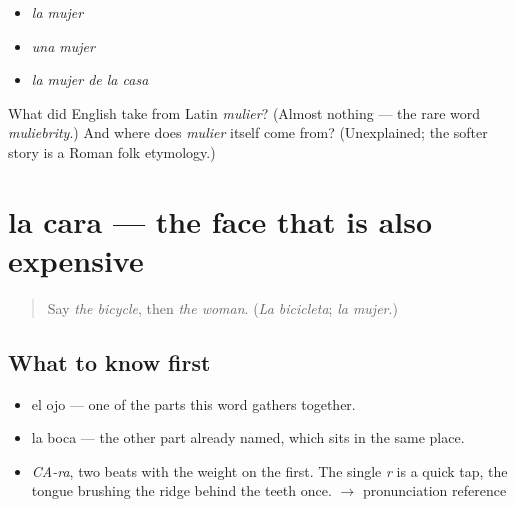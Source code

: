 \begin{itemize}
\raggedright
  \item \emph{la mujer}
  \item \emph{una mujer}
  \item \emph{la mujer de la casa}
\end{itemize}

\begin{tcolorbox}[breakable,colback=teal!4,colframe=teal!35!black,title={Before you move on}]
What did English take from Latin \emph{mulier}? (Almost nothing — the rare word \emph{muliebrity}.) And where does \emph{mulier} itself come from? (Unexplained; the softer story is a Roman folk etymology.)
\end{tcolorbox}
\section[la cara]{la cara — the face that is also expensive}

\label{lesson:ES-C364-cara}



\begin{quote}
Say \emph{the bicycle}, then \emph{the woman}. (\emph{La bicicleta}; \emph{la mujer}.)
\end{quote}

\subsection*{What to know first}
\begin{itemize}
\raggedright
  \item el ojo — one of the parts this word gathers together.
  \item la boca — the other part already named, which sits in the same place.
\end{itemize}

\begin{sounds}
\begin{itemize}
\raggedright
  \item \emph{CA-ra}, two beats with the weight on the first. The single \emph{r} is a quick tap, the tongue brushing the ridge behind the teeth once. $\to$ pronunciation reference
\end{itemize}
\end{sounds}

